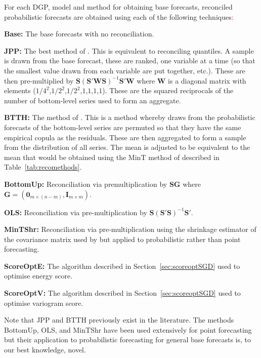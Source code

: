 \documentclass[a4paper,12pt]{article}
\theoremstyle{definition}
\begin{document}
For each DGP, model and method for obtaining base forecasts, reconciled probabilistic forecasts are obtained using each of the following techniques\textcolor{red}{:}
\begin{compactitem}
	\item \textbf{Base:} The base forecasts with no reconciliation.
	\item \textbf{JPP:} The best method of \cite{JeoEtAl2019}. This is equivalent to reconciling quantiles. A sample is drawn from the base forecast, these are ranked, one variable at a time (so that the smallest value drawn from each variable are put together, etc.). These are then pre-multiplied by $\bm{S}\left(\bm{S}'\bm{W}\bm{S}\right)^{-1}\bm{S}'\bm{W}$ where $\bm{W}$ is a diagonal matrix with elements ($1/4^2$,$1/2^2$,$1/2^2$,$1$,$1$,$1$,$1$). These are the squared reciprocals of the number of bottom-level series used to form an aggregate.
	\item \textbf{BTTH:} The method of \cite{Taieb2017}. This is a method whereby draws from the probabilistic forecasts of the bottom-level series are permuted so that they have the same empirical copula as the residuals. These are then aggregated to form a sample from the distribution of all series. The mean is adjusted to be equivalent to the mean that would be obtained using the MinT method of \cite{WicEtAl2019} described in Table~\ref{tab:recomethods}.
	\item \textbf{BottomUp:} Reconciliation via premultiplication by $\bm{S}\bm{G}$ where $\bm{G}=\left(\bm{0}_{m\times(n-m)},\bm{I}_{m\times m}\right)$.
	\item \textbf{OLS:} Reconciliation via pre-multiplication by $\bm{S}\left(\bm{S}'\bm{S}\right)^{-1}\bm{S}'$.
	\item \textbf{MinTShr:} Reconciliation via pre-multiplication using the shrinkage estimator of the covariance matrix used by \cite{WicEtAl2019} but applied to probabilistic rather than point forecasting.
	\item \textbf{ScoreOptE:} The algorithm described in Section~\ref{sec:scoreoptSGD} used to optimise energy score.
	\item \textbf{ScoreOptV:} The algorithm described in Section~\ref{sec:scoreoptSGD} used to optimise variogram score.
\end{compactitem}

Note that JPP and BTTH previously exist in the literature. The methods BottomUp, OLS, and MinTShr have been used extensively for point forecasting but their application to probabilistic forecasting for general base forecasts is, to our best knowledge, novel.
\end{document}
